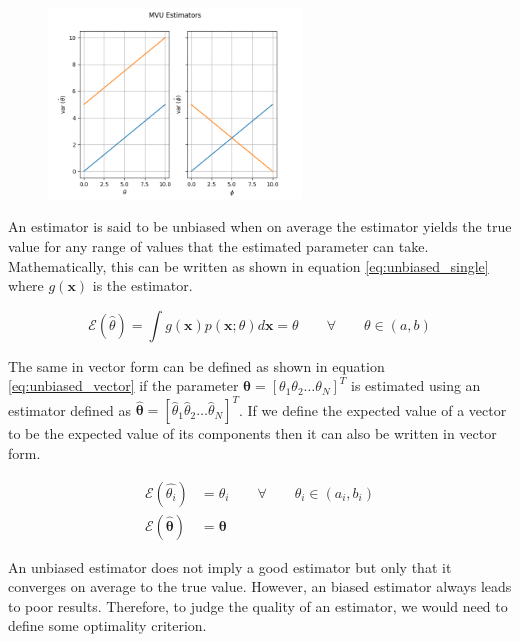 \begin{figure}
    \begin{center}
        \includegraphics[width=0.6\textwidth]{assets/mvu.png}
    \end{center}
    \label{fig:mvu}
\end{figure}

An estimator is said to be unbiased when on average the estimator yields the true value for any range of values that the estimated parameter can take. Mathematically, this can be written as shown in equation \ref{eq:unbiased_single} where $g(\mathbf{x})$ is the estimator.

\begin{equation}
    \mathcal{E}(\hat{\theta}) = \int g(\mathbf{x}) p(\mathbf{x}; \theta) d\mathbf{x} = \theta \qquad \forall \qquad \theta \in \left(a, b\right)
    \label{eq:unbiased_single}
\end{equation}

The same in vector form can be defined as shown in equation \ref{eq:unbiased_vector} if the parameter $\mathbf{\theta} = \left[\theta_1 \theta_2 \hdots \theta_N\right]^T$ is estimated using an estimator defined as $\mathbf{\hat{\theta}} = \left[\hat{\theta}_1 \hat{\theta}_2 \hdots \hat{\theta}_N\right]^T$. If we define the expected value of a vector to be the expected value of its components then it can also be written in vector form.

\begin{equation}
    \begin{split}
        \mathcal{E}(\hat{\theta_i}) &= \theta_i \qquad \forall \qquad \theta_i \in \left(a_i, b_i\right) \\
        \mathcal{E}(\hat{\mathbf{\theta}}) &= \mathbf{\theta}
    \end{split}
    \label{eq:unbiased_vector}
\end{equation}

An unbiased estimator does not imply a good estimator but only that it converges on average to the true value. However, an biased estimator always leads to poor results. Therefore, to judge the quality of an estimator, we would need to define some optimality criterion.

